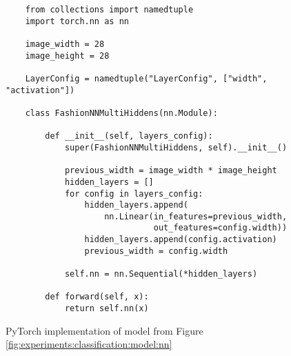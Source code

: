 \begin{figure}[H]
    \centering
    \begin{verbatim}
    from collections import namedtuple
    import torch.nn as nn
    
    image_width = 28
    image_height = 28
    
    LayerConfig = namedtuple("LayerConfig", ["width", "activation"])
    
    class FashionNNMultiHiddens(nn.Module):
    
        def __init__(self, layers_config):
            super(FashionNNMultiHiddens, self).__init__()
    
            previous_width = image_width * image_height
            hidden_layers = []
            for config in layers_config:
                hidden_layers.append(
                    nn.Linear(in_features=previous_width,
                              out_features=config.width))
                hidden_layers.append(config.activation)
                previous_width = config.width
    
            self.nn = nn.Sequential(*hidden_layers)
    
        def forward(self, x):
            return self.nn(x)
    \end{verbatim}
    \caption{PyTorch implementation of model from Figure \ref{fig:experiments:classification:model:nn} }
    \label{fig:experiments:classification:model:nn-pytorch}
\end{figure}


